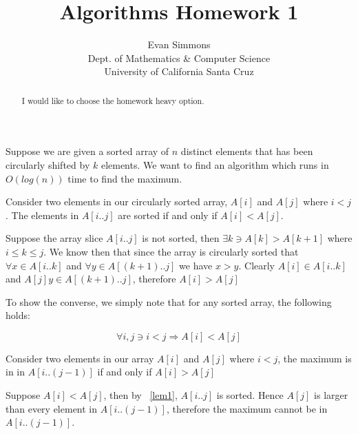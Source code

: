 \documentclass{amsart}
\theoremstyle{definition}
\theoremstyle{remark}
\numberwithin{equation}{section}
\begin{document}
\title[]{Algorithms Homework 1}%
\author{Evan Simmons \\
        Dept. of Mathematics \& Computer Science \\ University of California Santa Cruz}%
\renewcommand{\abstractname}{Homework Option}
\begin{abstract}
I would like to choose the homework heavy option.
\end{abstract}
\maketitle

\section{} 

Suppose we are given a sorted array of $n$ distinct elements
that has been circularly shifted by $k$ elements. We want to find an
algorithm which runs in $O(log(n))$ time to find the maximum.

\lem \label{lem1}

Consider two elements in our circularly sorted array, $A[i]$ and $A[j]$
where $i < j$. The elements in $A[i..j]$ are sorted if
and only if $A[i] < A[j]$.

\proof{} 

Suppose the array slice $A[i..j]$ is not sorted, then $\exists k \ni
A[k] > A[k+1]$ where $i \leq k \leq j$. We know then that since the
array is circularly sorted that $\forall x \in A[i..k]$ and $\forall y
\in A[(k+1)..j]$ we have $x > y$. Clearly $A[i] \in A[i..k]$ and $A[j] y
\in A[(k+1)..j]$, therefore $A[i] > A[j]$

To show the converse, we simply note that for any sorted array, the
following holds:

$$ \forall i,j \ni i<j \Rightarrow A[i] < A[j] $$

\cor \label{cor1}

Consider two elements in our array $A[i]$ and $A[j]$ where $i<j$, the maximum
is in in $A[i..(j-1)]$ if and only if $A[i] > A[j]$

\proof 

Suppose $A[i] < A[j]$, then by ~\ref{lem1}, $A[i..j]$ is sorted. Hence
$A[j]$ is larger than every element in $A[i..(j-1)]$, therefore the maximum
cannot be in $A[i..(j-1)]$.
\end{document}
